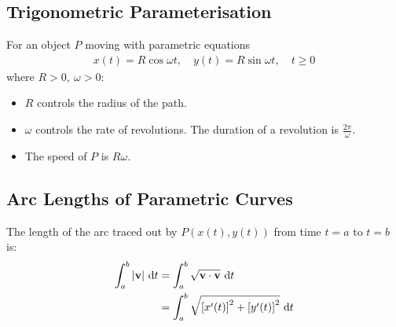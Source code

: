 \documentclass[10pt, a4paper, titlepage]{article}
\begin{document}
\begin{multicols*}{3}
	\dotfill
	\subsection{Trigonometric Parameterisation}
	For an object $P$ moving with parametric equations
	\begin{align}
		x(t)=R\cos{\omega t},\quad y(t)=R\sin{\omega t},\quad t\geq 0
	\end{align} 
	where $R>0,\ \omega >0$:
	\begin{itemize}
		\item $R$ controls the radius of the path.
		\item $\omega$ controls the rate of revolutions. The duration of a revolution is $\frac{2\pi}{\omega}$.
		\item The speed of $P$ is $R\omega$.
	\end{itemize}

	\dotfill
	\subsection{Arc Lengths of Parametric Curves}
	The length of the arc traced out by $P(x(t),y(t))$ from time $t=a$ to $t=b$ is:
	\begin{align}
		\int_{a}^{b}|\vb{v}|\,\dd{t}&=\int_{a}^{b}\sqrt{\vb{v}\cdot \vb{v}}\,\dd{t}\\
		&=\int_{a}^{b}\sqrt{\left[x'(t)\right]^2+\left[y'(t)\right]^2}\,\dd{t}
	\end{align}
	\hrulefill

\end{multicols*}
\end{document}
